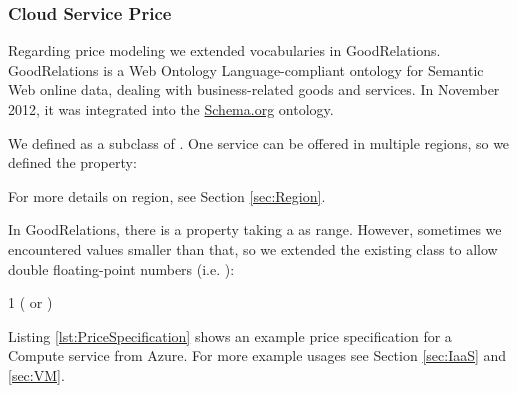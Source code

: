 \subsubsection{Cloud Service Price}
Regarding price modeling we extended vocabularies in GoodRelations.
GoodRelations is a Web Ontology Language-compliant ontology for Semantic Web online data, dealing with business-related goods and services. In November 2012, it was integrated into the \url{Schema.org} ontology.

\label{sec:PriceSpecification}
We defined  as a subclass of .
One service can be offered in multiple regions, so we defined the property:

  

For more details on region, see Section \ref{sec:Region}.

In GoodRelations, there is a  property taking a  as range.
However, sometimes we encountered values smaller than that, so we extended the existing class to allow double floating-point numbers (i.e. ):

  1 ( or )

Listing \ref{lst:PriceSpecification} shows an example price specification for a Compute service from Azure. For more example usages see Section \ref{sec:IaaS} and \ref{sec:VM}.

